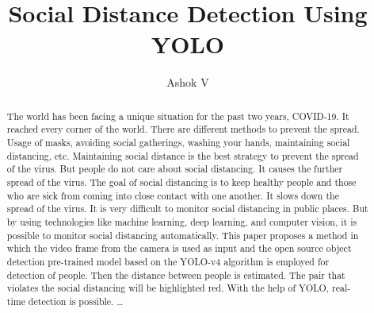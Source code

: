 \documentclass{svproc}
\begin{document}
\mainmatter              %
%
\title{Social Distance Detection Using YOLO}
%
\titlerunning{}  %
%
\author{Ashok V}
%
%
\tocauthor{}
%
\maketitle              %

\begin{abstract}
The world has been facing a unique situation for the past two years, COVID-19. It reached every corner of the world. There are different methods to prevent the spread. Usage of masks, avoiding social gatherings, washing your hands, maintaining social distancing, etc. Maintaining social distance is the best strategy to prevent the spread of the virus. But people do not care about social distancing. It causes the further spread of the virus. The goal of social distancing is to keep healthy people and those who are sick from coming into close contact with one another. It slows down the spread of the virus. It is very difficult to monitor social distancing in public places. But by using technologies like machine learning, deep learning, and computer vision, it is possible to monitor social distancing automatically. This paper proposes a method in which the video frame from the camera is used as input and the open source object detection pre-trained model based on the YOLO-v4 algorithm is employed for detection of people. Then the distance between people is estimated. The pair that violates the social distancing will be highlighted red. With the help of YOLO, real-time detection is possible.  \dots
\end{abstract}
%
\end{document}
